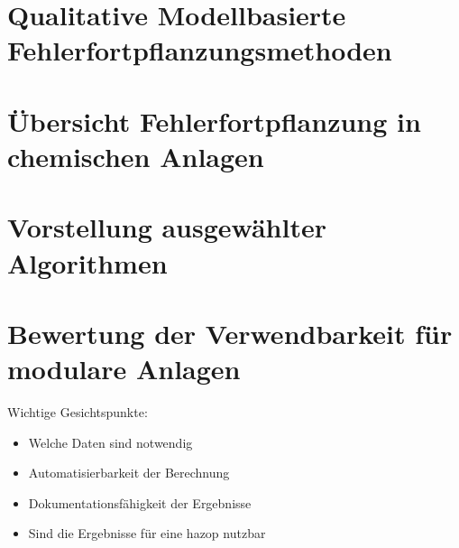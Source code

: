 \section{Qualitative Modellbasierte Fehlerfortpflanzungsmethoden}

\section{\"Ubersicht Fehlerfortpflanzung in chemischen Anlagen}
\section{Vorstellung ausgew\"ahlter Algorithmen}
\section{Bewertung der Verwendbarkeit f\"ur modulare Anlagen}
Wichtige Gesichtspunkte:
\begin{itemize}
\item Welche Daten sind notwendig
\item Automatisierbarkeit der Berechnung
\item Dokumentationsf\"ahigkeit der Ergebnisse
\item Sind die Ergebnisse f\"ur eine \ac{hazop} nutzbar
\end{itemize}